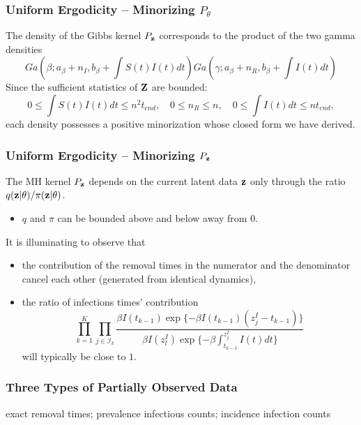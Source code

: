 \documentclass{beamer}
\begin{document}
\begin{frame} \frametitle{Uniform Ergodicity -- Minorizing $P_\theta$}
	
	The density of the Gibbs kernel $P_{\mathbf{z}}$ corresponds to the product of the two gamma densities
	$$Ga\left(\beta; a_{\beta} + n_I, b_{\beta} + \int S(t)I(t)dt\right)Ga\left(\gamma; a_{\beta} + n_R, b_{\beta} + \int I(t)dt\right)$$
	Since the sufficient statistics of $\mathbf{Z}$ are bounded:
	$$0 \le \int S(t)I(t)dt \le n^2t_{end}, \quad 0\le n_R \le n, \quad 0 \le \int I(t)dt \le n t_{end},$$
	each density possesses a positive minorization whose closed form we have derived.
	
\end{frame}




\begin{frame} \frametitle{Uniform Ergodicity -- Minorizing $P_{\mathbf{z}}$}
	
	The MH kernel $P_{\mathbf{z}}$ depends on the current latent data $\mathbf{z}$ only through the ratio $q(\mathbf{z}|\theta)/\pi(\mathbf{z}|\theta)$. 
	\begin{itemize}
		\item $q$ and $\pi$ can be bounded above and below away from $0$.
	\end{itemize}
	
	It is illuminating to observe that
	\begin{itemize}
		\item the contribution of the removal times in the numerator and the denominator cancel each other (generated from identical dynamics),
		\item the ratio of infections times' contribution 
		$$\prod_{k=1}^K \prod_{j\in \mathcal{I}_k}\dfrac{\beta I(t_{k-1}) \exp\{-\beta I(t_{k-1}) (z^I_j - t_{k-1})\}}
		{\beta I(z^I_l) \exp\{-\beta \int_{t_{k-1}}^{z^I_j} I(t)dt\}}$$
		will typically be close to $1$. 
	\end{itemize}
	
\end{frame}


\begin{frame} \frametitle{Three Types of Partially Observed Data}

exact removal times; prevalence infectious counts; incidence infection counts


\end{frame}
\end{document}
